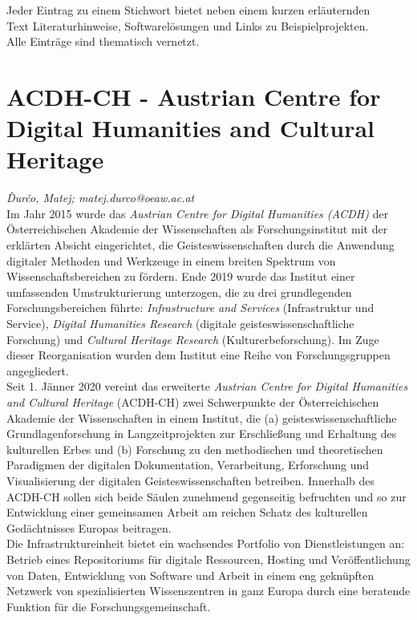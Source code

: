 \documentclass{article}
\begin{document}
Jeder Eintrag zu einem Stichwort bietet neben einem kurzen erläuternden \\
Text Literaturhinweise, Softwarelösungen und Links zu Beispielprojekten. \\
Alle Einträge sind thematisch vernetzt.\\
\newpage
        \section*{ACDH-CH - Austrian Centre for Digital Humanities and Cultural Heritage} \emph{Ďurčo, Matej; matej.durco@oeaw.ac.at}\\
        
    Im Jahr 2015 wurde das \emph{Austrian Centre for Digital Humanities (ACDH)} der Österreichischen Akademie der Wissenschaften als Forschungsinstitut mit der erklärten Absicht eingerichtet, die Geisteswissenschaften durch die Anwendung digitaler Methoden und Werkzeuge in einem breiten Spektrum von Wissenschaftsbereichen zu fördern. Ende 2019 wurde das Institut einer umfassenden Umstrukturierung unterzogen, die zu drei grundlegenden Forschungsbereichen führte: \emph{Infrastructure and Services} (Infrastruktur und Service), \emph{Digital Humanities Research} (digitale geisteswissenschaftliche Forschung) und \emph{Cultural Heritage Research} (Kulturerbeforschung). Im Zuge dieser Reorganisation wurden dem Institut eine Reihe von Forschungsgruppen angegliedert.\\
            
        Seit 1. Jänner 2020 vereint das erweiterte \emph{Austrian Centre for Digital Humanities and Cultural Heritage} (ACDH-CH) zwei Schwerpunkte der Österreichischen Akademie der Wissenschaften in einem Institut, die (a) geisteswissenschaftliche Grundlagenforschung in Langzeitprojekten zur Erschließung und Erhaltung des kulturellen Erbes und (b) Forschung zu den methodischen und theoretischen Paradigmen der digitalen Dokumentation, Verarbeitung, Erforschung und Visualisierung der digitalen Geisteswissenschaften betreiben. Innerhalb des ACDH-CH sollen sich beide Säulen zunehmend gegenseitig befruchten und so zur Entwicklung einer gemeinsamen Arbeit am reichen Schatz des kulturellen Gedächtnisses Europas beitragen.\\
            
        Die Infrastruktureinheit bietet ein wachsendes Portfolio von Dienstleistungen an: Betrieb eines Repositoriums für digitale Ressourcen, Hosting und Veröffentlichung von Daten, Entwicklung von Software und Arbeit in einem eng geknüpften Netzwerk von spezialisierten Wissenszentren in ganz Europa durch eine beratende Funktion für die Forschungsgemeinschaft.\\
            
\end{document}
